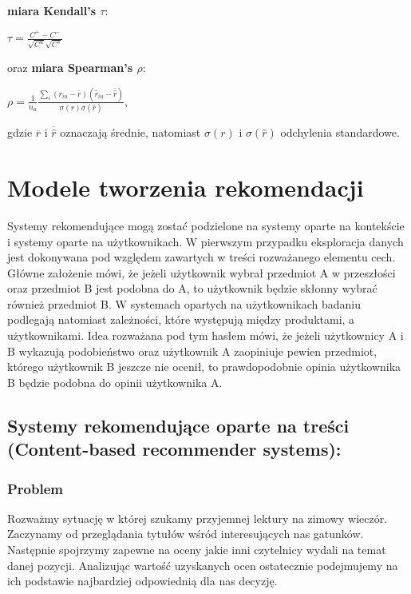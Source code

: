 \documentclass[12pt,a4paper]{report}
\begin{document}
\\\textbf{miara Kendall's $\tau$}:
\begin{center}
$\tau = \frac{C^{+} - C^{-} }{\sqrt{C^{u}}\sqrt{C^{s}}}$
\end{center}
oraz \textbf{miara Spearman's $\rho$}:
\begin{center}
$\rho = \frac{1}{n_{u}}\frac{\sum_i (r_{iu} - \overline{r})(\widehat{r}_{iu}-\overline{\widehat{r}})}{\sigma(r)\sigma(\widehat{r})}$,
\end{center}
gdzie $\overline{r}$ i $\overline{\widehat{r}}$ oznaczają średnie, natomiast $\sigma(r)$ i $\sigma(\widehat{r})$ odchylenia standardowe.




\chapter{Modele tworzenia rekomendacji}
Systemy rekomendujące mogą zostać podzielone na systemy oparte na kontekście i systemy oparte na użytkownikach. W pierwszym przypadku eksploracja danych jest dokonywana pod względem zawartych w treści rozważanego elementu cech. Główne założenie mówi, że jeżeli użytkownik wybrał przedmiot A w przeszłości oraz przedmiot B jest podobna do A, to użytkownik będzie skłonny wybrać również przedmiot B. W systemach opartych na użytkownikach badaniu podlegają natomiast zależności, które występują między produktami, a użytkownikami. Idea rozważana pod tym hasłem mówi, że jeżeli użytkownicy A i B wykazują podobieństwo oraz użytkownik A zaopiniuje pewien przedmiot, którego użytkownik B jeszcze nie ocenił, to prawdopodobnie opinia użytkownika B będzie podobna do opinii użytkownika A.


\section{Systemy rekomendujące oparte na treści (Content-based recommender systems):}
\subsection{Problem}
Rozważmy sytuację w której szukamy przyjemnej lektury na zimowy wieczór. Zaczynamy od przeglądania tytułów wśród interesujących nas gatunków. Następnie spojrzymy zapewne na oceny jakie inni czytelnicy wydali na temat danej pozycji. Analizując wartość uzyskanych ocen ostatecznie podejmujemy na ich podstawie najbardziej odpowiednią dla nas decyzję. 
\end{document}
